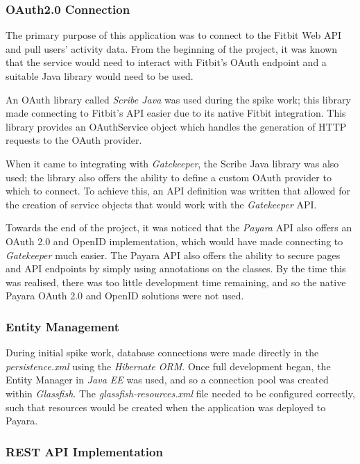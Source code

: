 \subsubsection{OAuth2.0 Connection}

The primary purpose of this application was to connect to the Fitbit Web API and pull users' activity data. From the beginning of the project, it was known that the service would need to interact with Fitbit's OAuth endpoint and a suitable Java library would need to be used.

An OAuth library called \textit{Scribe Java}\cite{ScribeJava} was used during the spike work; this library made connecting to Fitbit's API easier due to its native Fitbit integration. This library provides an OAuthService object which handles the generation of HTTP requests to the OAuth provider.

When it came to integrating with \textit{Gatekeeper}, the Scribe Java library was also used; the library also offers the ability to define a custom OAuth provider to which to connect. To achieve this, an API definition was written that allowed for the creation of service objects that would work with the \textit{Gatekeeper} API.

Towards the end of the project, it was noticed that the \textit{Payara}\cite{payara} API also offers an OAuth 2.0 and OpenID implementation, which would have made connecting to \textit{Gatekeeper} much easier. The Payara API also offers the ability to secure pages and API endpoints by simply using annotations on the classes. By the time this was realised, there was too little development time remaining, and so the native Payara OAuth 2.0 and OpenID solutions were not used.

\subsubsection{Entity Management}

During initial spike work, database connections were made directly in the \textit{persistence.xml} using the \textit{Hibernate ORM}\cite{Hibernate}. Once full development began, the Entity Manager in \textit{Java EE} was used, and so a connection pool was created within \textit{Glassfish}\cite{glassfish}. The \textit{glassfish-resources.xml} file needed to be configured correctly, such that resources would be created when the application was deployed to Payara.

\subsubsection{REST API Implementation}


